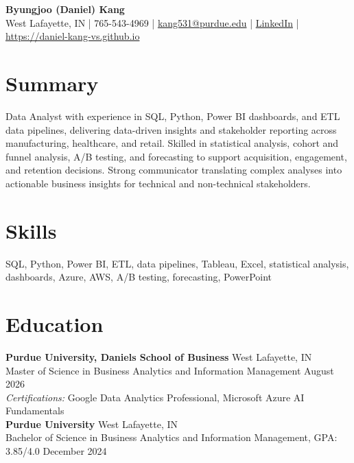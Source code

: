 \documentclass[11pt,a4paper]{article}
\begin{document}
\pagestyle{empty}

\begin{center}
    {\Huge \textbf{Byungjoo (Daniel) Kang}}  \\[4pt]
    West Lafayette, IN | 765-543-4969 | \href{mailto:kang531@purdue.edu}{kang531@purdue.edu} | \href{https://www.linkedin.com/in/daniel-byungjoo-kang/}{LinkedIn} | \url{https://daniel-kang-vs.github.io}  
\end{center}

\section*{Summary}  
Data Analyst with experience in SQL, Python, Power BI dashboards, and ETL data pipelines, delivering data-driven insights and stakeholder reporting across manufacturing, healthcare, and retail. Skilled in statistical analysis, cohort and funnel analysis, A/B testing, and forecasting to support acquisition, engagement, and retention decisions. Strong communicator translating complex analyses into actionable business insights for technical and non-technical stakeholders.  


\section*{Skills}
SQL, Python, Power BI, ETL, data pipelines, Tableau, Excel, statistical analysis, dashboards, Azure, AWS, A/B testing, forecasting, PowerPoint

\section*{Education}  
\noindent
\textbf{Purdue University, Daniels School of Business} \hfill West Lafayette, IN   \\
Master of Science in Business Analytics and Information Management \hfill August 2026   \\
\textit{Certifications:} Google Data Analytics Professional, Microsoft Azure AI Fundamentals   \\[6pt]
\textbf{Purdue University} \hfill West Lafayette, IN   \\
Bachelor of Science in Business Analytics and Information Management, GPA: 3.85/4.0 \hfill December 2024  

\end{document}
